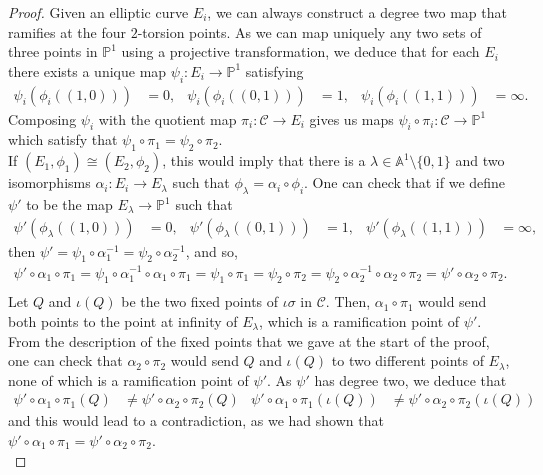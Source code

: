 \documentclass{amsart}
\newcommand{\calC}{\mathcal{C}}
\numberwithin{equation}{section}
\theoremstyle{definition}
\theoremstyle{remark}
\begin{document}
\begin{proof}
Given an elliptic curve $E_i$, we can always construct a degree two map that ramifies at the four $2$-torsion points. As we can map uniquely any two sets of three points in $\mathbb{P}^1$ using a projective transformation, we deduce that for each $E_i$ there exists a unique map $\psi_i: E_i\rightarrow\mathbb{P}^1$ satisfying
\begin{align*}
\psi_i(\phi_i((1,0)))&=0, & \psi_i(\phi_i((0,1)))&=1, &  \psi_i(\phi_i((1,1)))&=\infty.
\end{align*}
Composing $\psi_i$ with the quotient map $\pi_i:\calC\rightarrow E_i$ gives us maps $\psi_i\circ\pi_i:\calC\rightarrow\mathbb{P}^1$ which satisfy that $\psi_1\circ\pi_1=\psi_2\circ\pi_2$.\\

If $(E_1,\phi_1)\cong(E_2,\phi_2)$, this would imply that there is a $\lambda\in\mathbb{A}^1\setminus\{0,1\}$ and two isomorphisms $\alpha_i:E_i\rightarrow E_\lambda$ such that $\phi_\lambda=\alpha_i\circ\phi_i$. 
One can check that if we define $\psi'$ to be the map $E_\lambda\rightarrow\mathbb{P}^1$ such that
\begin{align*}
\psi'(\phi_\lambda((1,0)))&=0, & \psi'(\phi_\lambda((0,1)))&=1, &  \psi'(\phi_\lambda((1,1)))&=\infty,
\end{align*}
then $\psi'=\psi_1\circ\alpha_1^{-1}=\psi_2\circ\alpha_2^{-1}$, and so,
\begin{align*}
\psi'\circ\alpha_1\circ\pi_1=\psi_1\circ\alpha_1^{-1}\circ\alpha_1\circ\pi_1=\psi_1\circ\pi_1=\psi_2\circ\pi_2=\psi_2\circ\alpha_2^{-1}\circ\alpha_2\circ\pi_2=\psi'\circ\alpha_2\circ\pi_2.\\
\end{align*}
Let $Q$ and $\iota(Q)$ be the two fixed points of $\iota\sigma$ in $\calC$. Then, $\alpha_1\circ\pi_1$ would send both points to the point at infinity of $E_\lambda$, which is a ramification point of $\psi'$. From the description of the fixed points that we gave at the start of the proof, one can check that $\alpha_2\circ\pi_2$ would send $Q$ and $\iota(Q)$ to two different points of $E_\lambda$, none of which is a ramification point of $\psi'$. As $\psi'$ has degree two, we deduce that 
\begin{align*}
\psi'\circ\alpha_1\circ\pi_1(Q)&\neq\psi'\circ\alpha_2\circ\pi_2(Q) & \psi'\circ\alpha_1\circ\pi_1(\iota(Q))&\neq\psi'\circ\alpha_2\circ\pi_2(\iota(Q)) 
\end{align*}
and this would lead to a contradiction, as we had shown that $\psi'\circ\alpha_1\circ\pi_1=\psi'\circ\alpha_2\circ\pi_2$.\\[10pt]


\end{proof}
\end{document}
